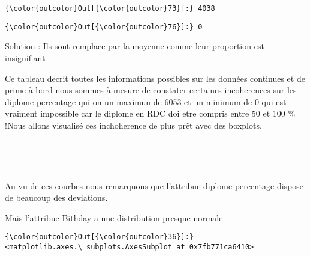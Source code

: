 \documentclass[11pt]{article}
\begin{document}
            \begin{Verbatim}[commandchars=\\\{\}]
{\color{outcolor}Out[{\color{outcolor}73}]:} 4038
\end{Verbatim}
        
            \begin{Verbatim}[commandchars=\\\{\}]
{\color{outcolor}Out[{\color{outcolor}76}]:} 0
\end{Verbatim}
        
    Solution : Ils sont remplace par la moyenne comme leur proportion est
insignifiant

    Ce tableau decrit toutes les informations possibles sur les données
continues et de prime à bord nous sommes à mesure de constater certaines
incoherences sur les diplome percentage qui on un maximun de 6053 et un
minimum de 0 qui est vraiment impossible car le diplome en RDC doi etre
compris entre 50 et 100 \% !Nous allons visualisé ces inchoherence de
plus prêt avec des boxplots.

    \begin{center}
    \end{center}
    { \hspace*{\fill} \\}
    
    \begin{center}
    \end{center}
    { \hspace*{\fill} \\}
    
    Au vu de ces courbes nous remarquons que l'attribue diplome percentage
dispose de beaucoup des deviations.

    Mais l'attribue Bithday a une distribution presque normale

            \begin{Verbatim}[commandchars=\\\{\}]
{\color{outcolor}Out[{\color{outcolor}36}]:} <matplotlib.axes.\_subplots.AxesSubplot at 0x7fb771ca6410>
\end{Verbatim}
        
    \begin{center}
    \end{center}
    { \hspace*{\fill} \\}
    
\end{document}
